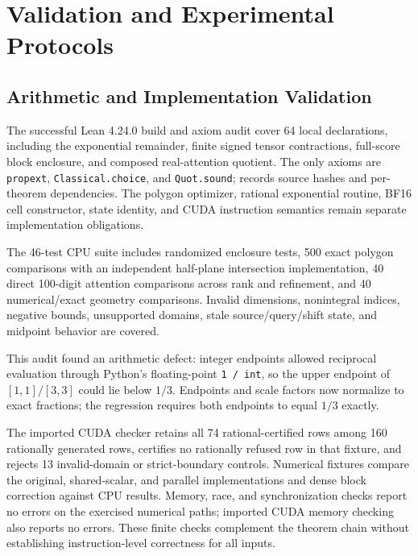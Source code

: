 \FloatBarrier
\section{Validation and Experimental Protocols}
\label{sec:experiments-appendix}

\FloatBarrier
\subsection{Arithmetic and Implementation Validation}
\label{sec:experimental-validation}

The successful Lean 4.24.0 build and axiom audit cover 64 local declarations,
including the exponential remainder, finite signed tensor contractions,
full-score block enclosure, and composed real-attention quotient. The only
axioms are \texttt{propext}, \texttt{Classical.choice}, and \texttt{Quot.sound};
 records source hashes and per-theorem
dependencies. The polygon optimizer, rational exponential routine, BF16 cell
constructor, state identity, and CUDA instruction semantics remain separate
implementation obligations.

The 46-test CPU suite includes randomized enclosure tests, 500 exact polygon
comparisons with an independent half-plane intersection implementation,
40 direct 100-digit attention comparisons across rank and refinement, and
40 numerical/exact geometry comparisons. Invalid dimensions, nonintegral
indices, negative bounds, unsupported domains, stale source/query/shift state,
and midpoint behavior are covered.

\begin{samepage}
This audit found an arithmetic defect:
integer endpoints allowed reciprocal evaluation through Python's floating-point
\mbox{\texttt{1 / int}}, so the upper endpoint of $[1,1]/[3,3]$ could lie below $1/3$.
Endpoints and scale factors now normalize to exact fractions; the regression
requires both endpoints to equal $1/3$ exactly.
\end{samepage}

The imported CUDA checker retains all 74 rational-certified rows among
160 rationally generated rows, certifies no rationally refused row in that
fixture, and rejects 13 invalid-domain or strict-boundary controls. Numerical
fixtures compare the original, shared-scalar, and parallel implementations and
dense block correction against CPU results. Memory, race, and synchronization
checks report no errors on the exercised numerical paths; imported CUDA memory
checking also reports no errors. These finite checks complement the theorem
chain without establishing instruction-level correctness for all inputs.

